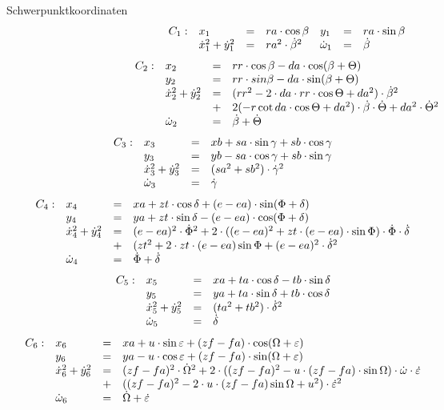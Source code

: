 \documentclass[12pt,a4paper,twoside,leqno]{article}
\begin{document}
Schwerpunktkoordinaten
%
\[
\ba{.}{lllllll}
C_1: & x_1 &=& ra\cdot \cos \beta & y_1 &=& ra \cdot \sin \beta\\
  & \dot{x}^2_1 + \dot{y}^2_1 &=& ra^2\cdot \dot{\beta}^2&
\dot{\omega}_1 &=& \dot{\beta}
\ea{.} \hspace{4cm}
\]
%
\[
\ba{.}{llll}
C_2 : & x_2 &=& rr\cdot \cos \beta - da \cdot \cos(\beta + \Theta)\\
& y_2 &=& rr\cdot sin \beta - da \cdot \sin(\beta + \Theta)\\
&\dot{x}^2_2 + \dot{y}^2_2 &=&
(rr^2 - 2\cdot da\cdot rr\cdot \cos \Theta + da^2)\cdot\dot{\beta}^2\\
&&+& 2(-r\cot da \cdot \cos \Theta + da^2)\cdot\dot{\beta}\cdot \dot{\Theta}
 + da^2 \cdot \dot{\Theta}^2\\
& \dot{\omega}_2 &=& \dot{\beta} + \dot{\Theta}
\ea{.}\hspace{4cm}
\]
%
\[
\ba{.}{llll}
C_3 : & x_3 &=& xb + sa\cdot\sin \gamma + sb \cdot \cos \gamma\\
& y_3 &=& yb - sa \cdot\cos \gamma + sb \cdot \sin \gamma\\
&\dot{x}^2_3 + \dot{y}^2_3 &=& (sa^2 + sb^2)\cdot\dot{\gamma}^2\\
& \dot{\omega}_3 &=& \dot{\gamma}
\ea{.}\hspace{8cm}
\]
%
\[
\ba{.}{llll}
C_4: & x_4 &=& xa + zt\cdot \cos \delta + (e - ea)\cdot\sin(\Phi+ \delta)\\
&y_4 &=& ya + zt\cdot\sin \delta - (e - ea)\cdot\cos(\Phi + \delta)\\
&\dot{x}^2_4 + \dot{y}^2_4
&=& (e - ea)^2\cdot\dot{\Phi}^2 + 2\cdot((e - ea)^2 +
zt \cdot (e - ea)\cdot \sin \Phi)\cdot \dot{\Phi} \cdot \dot{\delta}\\
&&+& (zt^2 + 2\cdot zt\cdot(e-ea)\sin \Phi + (e - ea)^2\cdot
\dot{\delta}^2\\
&\dot{\omega}_4 &=& \dot{\Phi} + \dot{\delta}
\ea{.}\hspace{8cm}
\]
%
\[
\ba{.}{llll}
C_5: &x_5 &=& xa + ta\cdot\cos \delta - tb \cdot \sin \delta\\
&y_5 &=& ya + ta\cdot \sin \delta + tb \cdot\cos \delta\\
&\dot{x}^2_5 + \dot{y}^2_5 &=& (ta^2 + tb^2)\cdot \dot{\delta}^2\\
&\dot{\omega}_5 &=& \dot{\delta}
\ea{.}\hspace{8cm}
\]
%
\[
\ba{.}{llll}
C_6 :&
x_6 &=& xa + u\cdot \sin \epsilon + (zf - fa)\cdot \cos(\Omega + \epsilon)\\
& y_6 &=& ya - u\cdot \cos \epsilon + (zf - fa)\cdot\sin(\Omega + \epsilon)\\
&\dot{x}^2_6 + \dot{y}^2_6 &=&
(zf - fa)^2\cdot\dot{\Omega}^2 + 2\cdot((zf-fa)^2 - u\cdot(zf- fa)\cdot \sin \Omega)\cdot \dot{\omega}\cdot \dot{\epsilon}\\
&&+&((zf-fa)^2-2\cdot u\cdot (zf-fa)\sin\Omega + u^2)\cdot \dot{\epsilon}^2\\
&\dot{\omega}_6 &=& \dot{\Omega} + \dot{\epsilon}
\ea{.}\hspace{8cm}
\]
\end{document}
